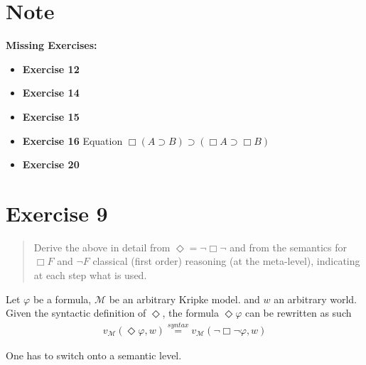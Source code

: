 \documentclass[11pt,a4paper]{article}
\newcommand{\lto}{\supset}
\newcommand{\some}{\Diamond}
\newcommand{\all}{\Box}
\begin{document}

\section*{Note}
\textbf{Missing Exercises:}
\begin{itemize}
\item \textbf{Exercise 12}
\item \textbf{Exercise 14}
\item \textbf{Exercise 15}
\item \textbf{Exercise 16} Equation $\all (A \lto B) \lto (\all A \lto \all B)$
\item \textbf{Exercise 20}
\end{itemize}

\section*{Exercise 9}
\begin{quote}
Derive the above in detail from $\some = \neg \all \neg $ and from the semantics for $\all F$ and $\neg F$ classical (first order) reasoning (at the meta-level), indicating at each step what is used.
\end{quote}

Let $\varphi$ be a formula, $\mathcal{M}$ be an arbitrary Kripke model. and $w$ an arbitrary world. Given the syntactic definition of $\some$, the formula $\some \varphi$ can be rewritten as such
\begin{equation*}
\begin{split}
v_{\mathcal{M}}(\some \varphi, w) \stackrel{syntax}{=} v_{\mathcal{M}}(\neg \all \neg \varphi,w)
\end{split}
\end{equation*}

One has to switch onto a semantic level.
\end{document}
